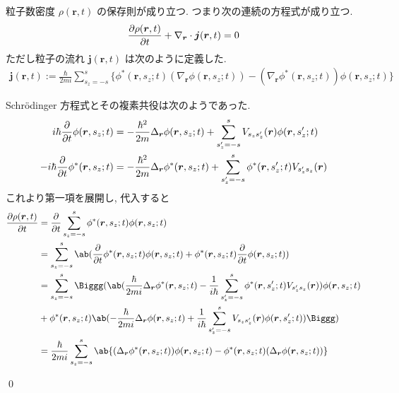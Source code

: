 \documentclass[uplatex,dvipdfmx,a4paper,11pt]{jlreq}
\makeatletter
\newcommand{\rr}{\bm{r}}
\numberwithin{equation}{section}
\theoremstyle{definition}
\renewenvironment{proof}[1][\proofname]{\par
  \normalfont
  \topsep6\p@\@plus6\p@ \trivlist
  \item[\hskip\labelsep{\bfseries #1}\@addpunct{\bfseries}]\ignorespaces\quad\par
}{
  \qed\endtrivlist\@endpefalse
}
\renewcommand\proofname{証明}
\makeatother
\begin{document}
\begin{theorem}[Q21-97(ii)(iii)(iv)]
  粒子数密度 $\rho(\rr, t)$ の保存則が成り立つ. つまり次の連続の方程式が成り立つ.
  \begin{align}
    \diffp{\rho(\rr, t)}{t} + \nabla_{\rr}\cdot\bm{j}(\rr, t) = 0
  \end{align}
  ただし粒子の流れ $\bm{j}(\rr, t)$ は次のように定義した.
  \begin{align}
    \bm{j}(\rr, t) := \frac{\hbar}{2mi}\sum_{s_z = -s}^{s}\{\phi^*(\rr, s_z; t)(\nabla_{\rr}\phi(\rr, s_z; t)) - (\nabla_{\rr}\phi^*(\rr, s_z; t))\phi(\rr, s_z; t)\}
  \end{align}
\end{theorem}
\begin{proof}
  Schrödinger 方程式とその複素共役は次のようであった.
  \begin{align}
    i\hbar\diffp{}{t}\phi(\rr, s_z; t)    & = -\frac{\hbar^2}{2m}\Delta_{\rr}\phi(\rr, s_z; t) + \sum_{s_z' = -s}^{s}V_{s_zs_z'}(\rr)\phi(\rr, s_z'; t)     \\
    -i\hbar\diffp{}{t}\phi^*(\rr, s_z; t) & = -\frac{\hbar^2}{2m}\Delta_{\rr}\phi^*(\rr, s_z; t) + \sum_{s_z' = -s}^{s}\phi^*(\rr, s_z'; t)V_{s_z's_z}(\rr)
  \end{align}
  これより第一項を展開し, 代入すると
  \begin{align}
    \diffp{\rho(\rr, t)}{t} & = \diffp{}{t}\sum_{s_z = -s}^{s}\phi^*(\rr, s_z; t)\phi(\rr, s_z; t)                                                                                                          \\
                            & = \sum_{s_z = -s}^{s}\ab(\diffp{}{t}\phi^*(\rr, s_z; t)\phi(\rr, s_z; t) + \phi^*(\rr, s_z; t)\diffp{}{t}\phi(\rr, s_z; t))                                                   \\
                            & = \sum_{s_z = -s}^{s}\Biggg(\ab(\frac{\hbar}{2mi}\Delta_{\rr}\phi^*(\rr, s_z; t) - \frac{1}{i\hbar}\sum_{s_z' = -s}^{s}\phi^*(\rr, s_z'; t)V_{s_z's_z}(\rr))\phi(\rr, s_z; t) \\
                            & + \phi^*(\rr, s_z; t)\ab(-\frac{\hbar}{2mi}\Delta_{\rr}\phi(\rr, s_z; t) + \frac{1}{i\hbar}\sum_{s_z' = -s}^{s}V_{s_zs_z'}(\rr)\phi(\rr, s_z'; t))\Biggg)                     \\
                            & = \frac{\hbar}{2mi}\sum_{s_z = -s}^{s}\ab\{(\Delta_{\rr}\phi^*(\rr, s_z; t))\phi(\rr, s_z; t) - \phi^*(\rr, s_z; t)(\Delta_{\rr}\phi(\rr, s_z; t))\}
  \end{align}

\end{proof}
\end{document}

